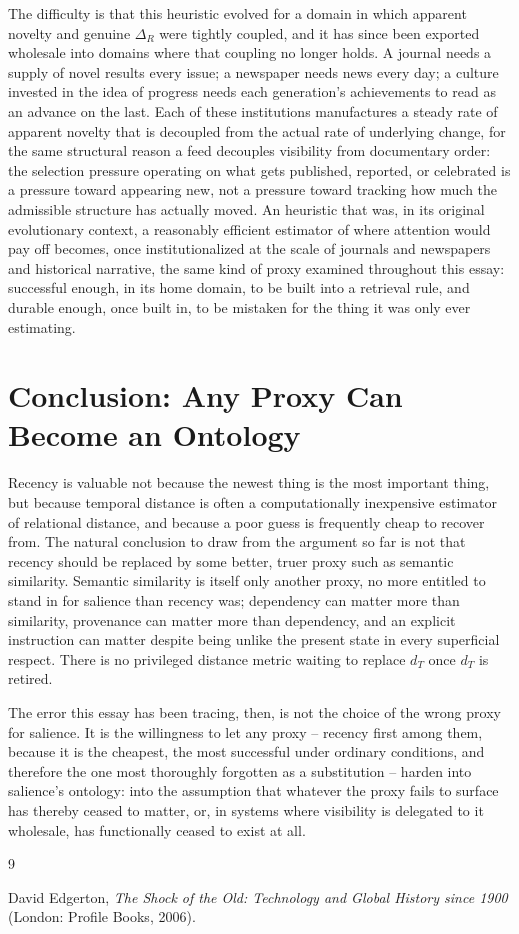 \documentclass[11pt]{article}
\begin{document}
The difficulty is that this heuristic evolved for a domain in which apparent novelty and genuine $\Delta_R$ were tightly coupled, and it has since been exported wholesale into domains where that coupling no longer holds. A journal needs a supply of novel results every issue; a newspaper needs news every day; a culture invested in the idea of progress needs each generation's achievements to read as an advance on the last. Each of these institutions manufactures a steady rate of apparent novelty that is decoupled from the actual rate of underlying change, for the same structural reason a feed decouples visibility from documentary order: the selection pressure operating on what gets published, reported, or celebrated is a pressure toward appearing new, not a pressure toward tracking how much the admissible structure has actually moved. An heuristic that was, in its original evolutionary context, a reasonably efficient estimator of where attention would pay off becomes, once institutionalized at the scale of journals and newspapers and historical narrative, the same kind of proxy examined throughout this essay: successful enough, in its home domain, to be built into a retrieval rule, and durable enough, once built in, to be mistaken for the thing it was only ever estimating.

\section{Conclusion: Any Proxy Can Become an Ontology}

Recency is valuable not because the newest thing is the most important thing, but because temporal distance is often a computationally inexpensive estimator of relational distance, and because a poor guess is frequently cheap to recover from. The natural conclusion to draw from the argument so far is not that recency should be replaced by some better, truer proxy such as semantic similarity. Semantic similarity is itself only another proxy, no more entitled to stand in for salience than recency was; dependency can matter more than similarity, provenance can matter more than dependency, and an explicit instruction can matter despite being unlike the present state in every superficial respect. There is no privileged distance metric waiting to replace $d_T$ once $d_T$ is retired.

The error this essay has been tracing, then, is not the choice of the wrong proxy for salience. It is the willingness to let any proxy -- recency first among them, because it is the cheapest, the most successful under ordinary conditions, and therefore the one most thoroughly forgotten as a substitution -- harden into salience's ontology: into the assumption that whatever the proxy fails to surface has thereby ceased to matter, or, in systems where visibility is delegated to it wholesale, has functionally ceased to exist at all.

\begin{thebibliography}{9}

David Edgerton, \emph{The Shock of the Old: Technology and Global History since 1900} (London: Profile Books, 2006).

\end{thebibliography}
\end{document}
